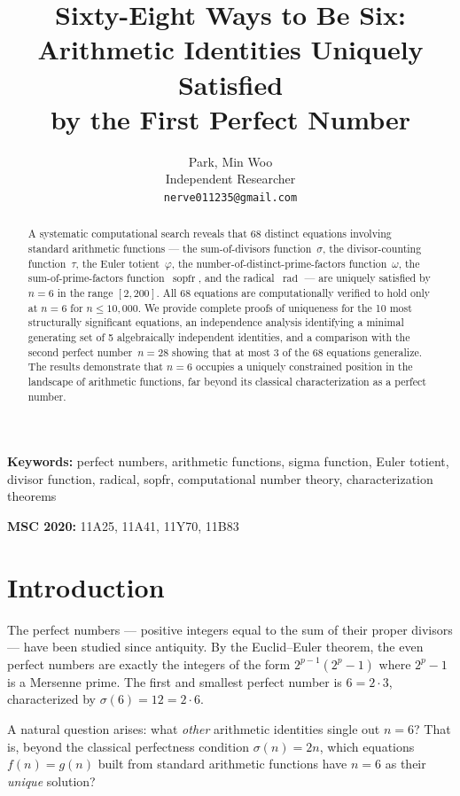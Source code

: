 \documentclass{article}
\title{Sixty-Eight Ways to Be Six:\\
Arithmetic Identities Uniquely Satisfied\\
by the First Perfect Number}
\author{Park, Min Woo\\
\small Independent Researcher\\
\small \texttt{nerve011235@gmail.com}}
\date{}
\newcommand{\rad}{\operatorname{rad}}
\newcommand{\sopfr}{\operatorname{sopfr}}
\begin{document}
\maketitle

\begin{abstract}
A systematic computational search reveals that 68 distinct equations involving standard arithmetic functions --- the sum-of-divisors function~$\sigma$, the divisor-counting function~$\tau$, the Euler totient~$\varphi$, the number-of-distinct-prime-factors function~$\omega$, the sum-of-prime-factors function~$\sopfr$, and the radical~$\rad$ --- are uniquely satisfied by $n = 6$ in the range $[2, 200]$. All 68 equations are computationally verified to hold only at $n = 6$ for $n \leq 10{,}000$. We provide complete proofs of uniqueness for the 10 most structurally significant equations, an independence analysis identifying a minimal generating set of 5 algebraically independent identities, and a comparison with the second perfect number~$n = 28$ showing that at most 3 of the 68 equations generalize. The results demonstrate that $n = 6$ occupies a uniquely constrained position in the landscape of arithmetic functions, far beyond its classical characterization as a perfect number.
\end{abstract}

\noindent\textbf{Keywords:} perfect numbers, arithmetic functions, sigma function, Euler totient, divisor function, radical, sopfr, computational number theory, characterization theorems

\noindent\textbf{MSC 2020:} 11A25, 11A41, 11Y70, 11B83

\bigskip

\section{Introduction}

The perfect numbers --- positive integers equal to the sum of their proper divisors --- have been studied since antiquity. By the Euclid--Euler theorem, the even perfect numbers are exactly the integers of the form $2^{p-1}(2^p - 1)$ where $2^p - 1$ is a Mersenne prime. The first and smallest perfect number is $6 = 2 \cdot 3$, characterized by $\sigma(6) = 12 = 2 \cdot 6$.

A natural question arises: what \emph{other} arithmetic identities single out $n = 6$? That is, beyond the classical perfectness condition $\sigma(n) = 2n$, which equations $f(n) = g(n)$ built from standard arithmetic functions have $n = 6$ as their \emph{unique} solution?
\end{document}
